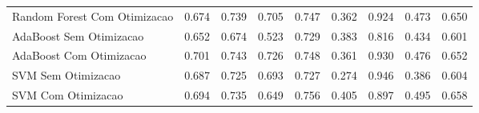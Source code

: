 \begin{table}[H]
\begin{adjustwidth}{ -1in }{ -1in }
\begin{tabular}{lrrrrrrrr}
      Random Forest Com Otimizacao &                        0.674 &                         0.739 &                            0.705 &                            0.747 &                          0.362 &                          0.924 &                                     0.473 &                                 0.650 \\
           AdaBoost Sem Otimizacao &                        0.652 &                         0.674 &                            0.523 &                            0.729 &                          0.383 &                          0.816 &                                     0.434 &                                 0.601 \\
           AdaBoost Com Otimizacao &                        0.701 &                         0.743 &                            0.726 &                            0.748 &                          0.361 &                          0.930 &                                     0.476 &                                 0.652 \\
                SVM Sem Otimizacao &                        0.687 &                         0.725 &                            0.693 &                            0.727 &                          0.274 &                          0.946 &                                     0.386 &                                 0.604 \\
                SVM Com Otimizacao &                        0.694 &                         0.735 &                            0.649 &                            0.756 &                          0.405 &                          0.897 &                                     0.495 &                                 0.658 \\
\bottomrule
\end{tabular}
    \end{adjustwidth}
    \renewcommand{\arraystretch}{1.0} %
\end{table}
